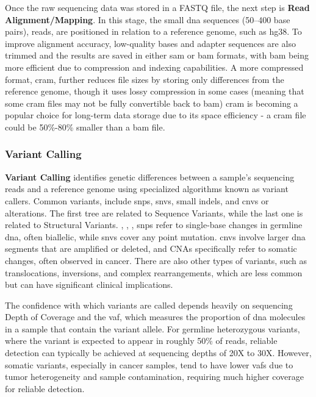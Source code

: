 Once the raw sequencing data was stored in a FASTQ file, the next step is \textbf{Read Alignment/Mapping}. \cite{Larson2023} In this stage, the small \ac{dna} sequences (50–400 base pairs), reads, are positioned in relation to a reference genome, such as \ac{hg38}.  \cite{Rehm2013} To improve alignment accuracy, low-quality bases and adapter sequences are also trimmed and the results are saved in either \ac{sam} or \ac{bam} formats, with \ac{bam} being more efficient due to compression and indexing capabilities. A more compressed format, \ac{cram}, further reduces file sizes by storing only differences from the reference genome, though it uses lossy compression in some cases (meaning that some \ac{cram} files may not be fully convertible back to \ac{bam}) \ac{cram} is becoming a popular choice for long-term data storage due to its space efficiency - a \ac{cram} file could be 50\%-80\% smaller than a \ac{bam} file. \cite{Larson2023}

\subsubsection{\textbf{Variant Calling}} \label{subsubsec:ngs_variantcalling}

\textbf{Variant Calling} identifies genetic differences between a sample's sequencing reads and a reference genome using specialized algorithms known as variant callers. Common variants, include \ac{snps}, \ac{snvs}, small \ac{indels}, and \ac{cnvs} or alterations. The first tree are related to Sequence Variants, while the last one is related to Structural Variants. \cite{Roy2018}, \cite{pipeline}, \cite{Roy2020}, \cite{Kanzi2020} \ac{snps} refer to single-base changes in germline \ac{dna}, often biallelic, while \ac{snvs} cover any point mutation. \ac{cnvs} involve larger \ac{dna} segments that are amplified or deleted, and CNAs specifically refer to somatic changes, often observed in cancer. \cite{Larson2023} There are also other types of variants, such as translocations, inversions, and complex rearrangements, which are less common but can have significant clinical implications. \cite{Roy2018}

The confidence with which variants are called depends heavily on sequencing Depth of Coverage and the \ac{vaf}, which measures the proportion of \ac{dna} molecules in a sample that contain the variant allele. For germline heterozygous variants, where the variant is expected to appear in roughly 50\% of reads, reliable detection can typically be achieved at sequencing depths of 20X to 30X. However, somatic variants, especially in cancer samples, tend to have lower \ac{vaf}s due to tumor heterogeneity and sample contamination, requiring much higher coverage for reliable detection. \cite{Larson2023}

